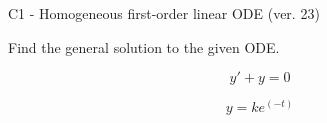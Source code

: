 \begin{exercise}
  \begin{exerciseTitle}C1 - Homogeneous first-order linear ODE (ver. 23)\end{exerciseTitle}
  \begin{exerciseStatement}
    
Find the general solution to the given ODE.

    
\[y'+y=0\]

  \end{exerciseStatement}
  \begin{exerciseAnswer}
    
\[y= k e^{\left(-t\right)}\]

  \end{exerciseAnswer}
\end{exercise}